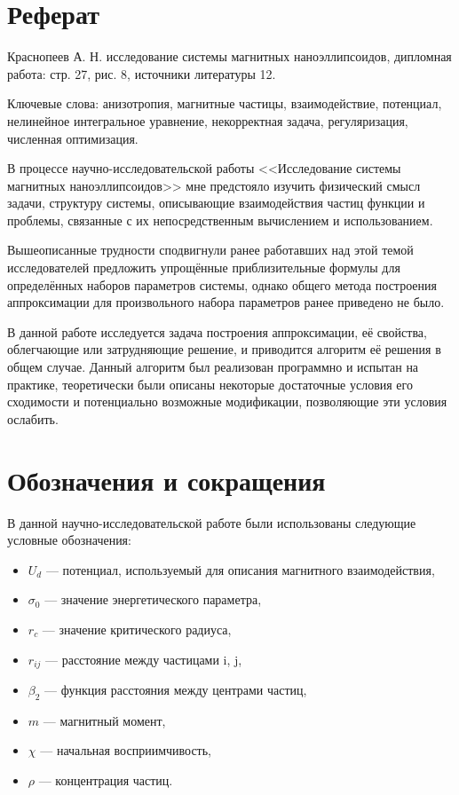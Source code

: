 \documentclass[a4paper,14pt]{extarticle}
\begin{document}
    

    \section*{Реферат}

    Краснопеев А. Н. исследование системы магнитных наноэллипсоидов,
    дипломная работа: стр. 27, рис. 8, источники
    литературы 12.

    Ключевые слова: анизотропия, магнитные частицы,
    взаимодействие, потенциал, нелинейное интегральное уравнение,
    некорректная задача, регуляризация, численная оптимизация.

    В процессе научно-исследовательской работы
    <<Исследование системы магнитных наноэллипсоидов>>
    мне предстояло изучить физический смысл задачи, структуру системы,
    описывающие взаимодействия частиц функции и проблемы, связанные с их
    непосредственным вычислением и использованием.

    Вышеописанные трудности сподвигнули ранее работавших над этой темой
    исследователей предложить упрощённые приблизительные формулы для
    определённых наборов параметров системы, однако общего метода
    построения аппроксимации для произвольного набора параметров ранее
    приведено не было.

    В данной работе исследуется задача построения аппроксимации,
    её свойства, облегчающие или затрудняющие решение, и приводится алгоритм
    её решения в общем случае.
    Данный алгоритм был реализован программно и испытан на практике,
    теоретически были описаны некоторые достаточные условия его сходимости
    и потенциально возможные модификации, позволяющие эти условия ослабить.

    \newpage

    \tableofcontents

    \newpage

    \section*{Обозначения и сокращения}

    В данной научно-исследовательской работе были использованы следующие
    условные обозначения:

    \begin{itemize}[label={}]
        \item $U_d$ --- потенциал, используемый для описания магнитного взаимодействия,
        \item $\sigma_0$ --- значение энергетического параметра,
        \item $r_c$ --- значение критического радиуса,
        \item $r_{ij}$ --- расстояние между частицами i, j,
        \item $\beta_2$ --- функция расстояния между центрами частиц,
        \item $m$ --- магнитный момент,
        \item $\chi$ --- начальная восприимчивость,
        \item $\rho$ --- концентрация частиц.
    \end{itemize}
\end{document}
